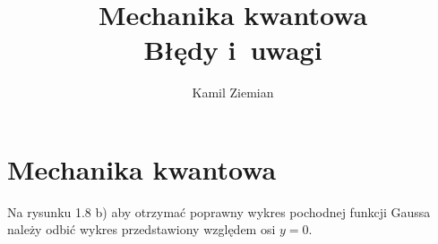 \documentclass[a4paper,11pt]{article}
\title{Mechanika kwantowa \\
  {\Large Błędy i~uwagi}}
\author{Kamil Ziemian}
\begin{document}





\maketitle %





\section{Mechanika kwantowa}

\vspace{\spaceTwo}




\vspace{0em}



\vspace{0em}


\noindent
{} Na rysunku 1.8 b) aby otrzymać poprawny wykres
pochodnej funkcji Gaussa należy odbić wykres przedstawiony względem osi
$y = 0$.

\vspace{\spaceFour}





\newpage

\end{document}
